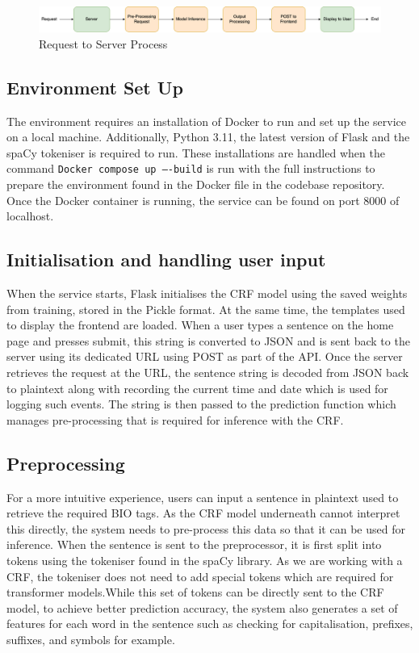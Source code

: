 \documentclass{surreydissertation}
\begin{document}
\begin{figure}
    \centering
    \includegraphics[width=1\textwidth]{Figures/NLPsystemoverview1.png}
    \caption{Request to Server Process}
    \label{fig:NLPsystemoverview1}
 \end{figure}

\subsection{Environment Set Up}
The environment requires an installation of Docker to run and set up the service on a local machine. Additionally, Python 3.11, the latest version of Flask and the spaCy tokeniser is required to run. These installations are handled when the command \texttt{Docker compose up –-build} is run with the full instructions to prepare the environment found in the Docker file in the codebase repository. Once the Docker container is running, the service can be found on port 8000 of localhost. 

\subsection{Initialisation and handling user input}
When the service starts, Flask initialises the CRF model using the saved weights from training, stored in the Pickle format. At the same time, the templates used to display the frontend are loaded. When a user types a sentence on the home page and presses submit, this string is converted to JSON and is sent back to the server using its dedicated URL using POST as part of the API. Once the server retrieves the request at the URL, the sentence string is decoded from JSON back to plaintext along with recording the current time and date which is used for logging such events. The string is then passed to the prediction function which manages pre-processing that is required for inference with the CRF.

\subsection{Preprocessing}
For a more intuitive experience, users can input a sentence in plaintext used to retrieve the required BIO tags. As the CRF model underneath cannot interpret this directly, the system needs to pre-process this data so that it can be used for inference. When the sentence is sent to the preprocessor, it is first split into tokens using the tokeniser found in the spaCy library. As we are working with a CRF, the tokeniser does not need to add special tokens which are required for transformer models.While this set of tokens can be directly sent to the CRF model, to achieve better prediction accuracy, the system also generates a set of features for each word in the sentence such as checking for capitalisation, prefixes, suffixes, and symbols for example.
\end{document}
